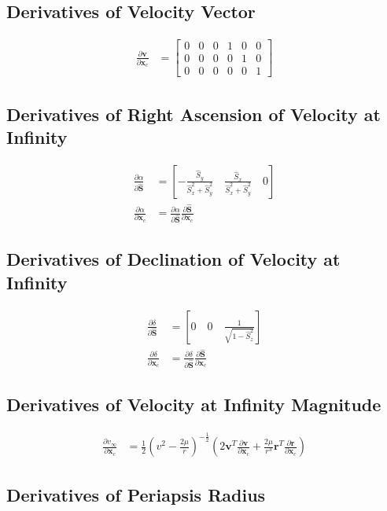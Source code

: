 \documentclass[]{article}
\newcommand{\vb}[1]{\bm{#1}} %
\newcommand{\vbh}[1]{\hat{\bm{#1}}} %
\newcommand{\pd}[2]{\frac{\partial #1}{\partial #2}} %
\newcommand{\xc}[0]{\vb{x}_c}
\begin{document}
\subsection{Derivatives of Velocity Vector}

\begin{align}
\pd{\vb{v}}{\xc} &= \left[ \begin{array}{cccccc}
0 & 0 & 0 & 1 & 0 & 0 \\
0 & 0 & 0 & 0 & 1 & 0 \\
0 & 0 & 0 & 0 & 0 & 1
\end{array} \right]
\end{align}

\subsection{Derivatives of Right Ascension of Velocity at Infinity}

\begin{align}
	\pd{\alpha}{\vbh{S}} &= \left[ -\frac{\hat{S}_y}{\hat{S}_x^2 + \hat{S}_y^2} \quad \frac{\hat{S}_x}{\hat{S}_x^2 + \hat{S}_y^2} \quad  0 \right] \\
	\pd{\alpha}{\xc} &= \pd{\alpha}{\vbh{S}} \pd{\vbh{S}}{\xc}
\end{align}

\subsection{Derivatives of Declination of Velocity at Infinity}

\begin{align}
\pd{\delta}{\vbh{S}} &= \left[ 0 \quad 0 \quad \frac{1}{\sqrt{1 - \hat{S}_z^2}} \right] \\
\pd{\delta}{\xc} &= \pd{\delta}{\vbh{S}} \pd{\vbh{S}}{\xc}
\end{align}

\subsection{Derivatives of Velocity at Infinity Magnitude}

\begin{align}
	\pd{v_{\infty}}{\xc} &= \frac{1}{2} \left( v^2 - \frac{2 \mu}{r} \right)^{-\frac{1}{2}} \left( 2 \vb{v}^T \pd{\vb{v}}{\xc} + \frac{2 \mu}{r^3} \vb{r}^T \pd{\vb{r}}{\xc} \right)
\end{align}

\subsection{Derivatives of Periapsis Radius}
\end{document}
